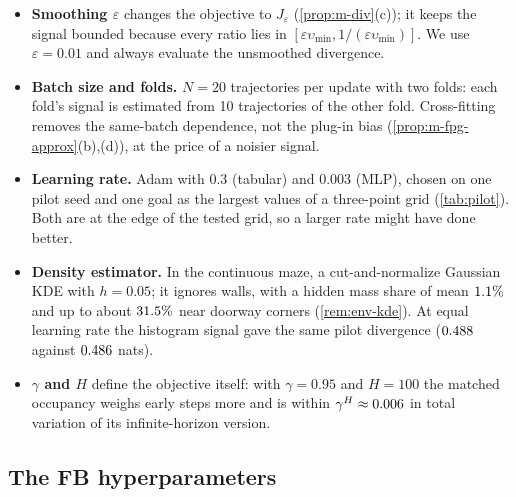 \begin{itemize}[nosep]
\item \textbf{Smoothing $\varepsilon$} changes the objective to $J_\varepsilon$ (\cref{prop:m-div}(c)); it keeps the signal bounded because every ratio lies in $[\varepsilon\upsilon_{\min},1/(\varepsilon\upsilon_{\min})]$. We use $\varepsilon=0.01$ and always evaluate the unsmoothed divergence.
\item \textbf{Batch size and folds.} $N=20$ trajectories per update with two folds: each fold's signal is estimated from 10 trajectories of the other fold. Cross-fitting removes the same-batch dependence, not the plug-in bias (\cref{prop:m-fpg-approx}(b),(d)), at the price of a noisier signal.
\item \textbf{Learning rate.} Adam with $0.3$ (tabular) and $0.003$ (MLP), chosen on one pilot seed and one goal as the largest values of a three-point grid (\cref{tab:pilot}). Both are at the edge of the tested grid, so a larger rate might have done better.
\item \textbf{Density estimator.} In the continuous maze, a cut-and-normalize Gaussian KDE with $h=0.05$; it ignores walls, with a hidden mass share of mean $\vn{kde.mean_pct}{1.1}\%$ and up to about $\vn{kde.max_pct}{31.5}\%$ near doorway corners (\cref{rem:env-kde}). At equal learning rate the histogram signal gave the same pilot divergence ($\vn{s09.hist.js}{0.488}$ against $\vn{s09.kde.js}{0.486}$ nats).
\item \textbf{$\gamma$ and $H$} define the objective itself: with $\gamma=0.95$ and $H=100$ the matched occupancy weighs early steps more and is within $\gamma^H\approx\vn{const.gH.006}{0.006}$ in total variation of its infinite-horizon version.
\end{itemize}

\subsection{The FB hyperparameters}

